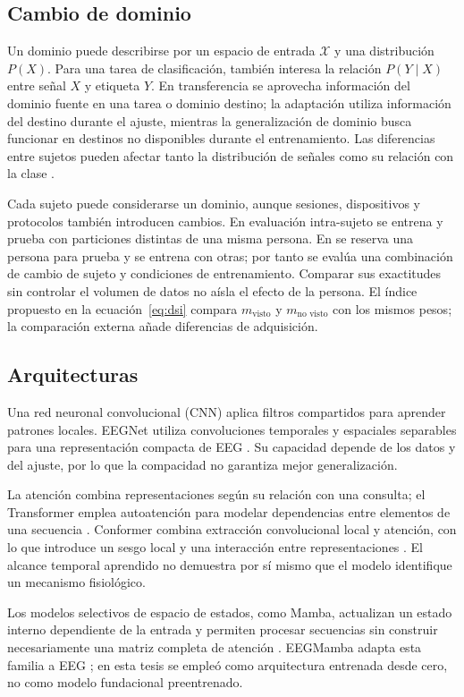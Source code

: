 \subsection{Cambio de dominio}
Un dominio puede describirse por un espacio de entrada $\mathcal X$ y una distribución $P(X)$. Para una tarea de clasificación, también interesa la relación $P(Y\mid X)$ entre señal $X$ y etiqueta $Y$. En transferencia se aprovecha información del dominio fuente en una tarea o dominio destino; la adaptación utiliza información del destino durante el ajuste, mientras la generalización de dominio busca funcionar en destinos no disponibles durante el entrenamiento. Las diferencias entre sujetos pueden afectar tanto la distribución de señales como su relación con la clase \cite{li2026survey,huang2023discrepancy}.

Cada sujeto puede considerarse un dominio, aunque sesiones, dispositivos y protocolos también introducen cambios. En evaluación intra-sujeto se entrena y prueba con particiones distintas de una misma persona. En \loso{} se reserva una persona para prueba y se entrena con otras; por tanto se evalúa una combinación de cambio de sujeto y condiciones de entrenamiento. Comparar sus exactitudes sin controlar el volumen de datos no aísla el efecto de la persona. El índice propuesto en la ecuación~\eqref{eq:dsi} compara $m_{\text{visto}}$ y $m_{\text{no visto}}$ con los mismos pesos; la comparación externa añade diferencias de adquisición.

\subsection{Arquitecturas}
Una red neuronal convolucional (CNN) aplica filtros compartidos para aprender patrones locales. EEGNet utiliza convoluciones temporales y espaciales separables para una representación compacta de EEG \cite{lawhern2018}. Su capacidad depende de los datos y del ajuste, por lo que la compacidad no garantiza mejor generalización.

La atención combina representaciones según su relación con una consulta; el Transformer emplea autoatención para modelar dependencias entre elementos de una secuencia \cite{vaswani2017attention}. Conformer combina extracción convolucional local y atención, con lo que introduce un sesgo local y una interacción entre representaciones \cite{song2023conformer}. El alcance temporal aprendido no demuestra por sí mismo que el modelo identifique un mecanismo fisiológico.

Los modelos selectivos de espacio de estados, como Mamba, actualizan un estado interno dependiente de la entrada y permiten procesar secuencias sin construir necesariamente una matriz completa de atención \cite{gu2023mamba}. EEGMamba adapta esta familia a EEG \cite{wang2025eegmamba}; en esta tesis se empleó como arquitectura entrenada desde cero, no como modelo fundacional preentrenado.

